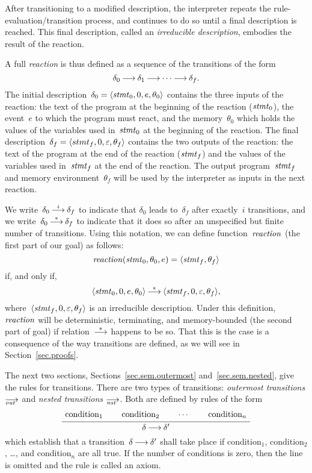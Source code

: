 After transitioning to a modified description, the interpreter repeats the
rule-evaluation/transition process, and continues to do so until a final
description is reached.  This final description, called an \emph{irreducible
  description}, embodies the result of the reaction.

A full \emph{reaction} is thus defined as a sequence of the transitions of
the form
\[
  \delta_0\trans\delta_1\trans\cdots\trans\delta_f.
\]
The initial description~$\delta_0=\<\stmt_0,0,e,\theta_0>$ contains the
three inputs of the reaction: the text of the program at the beginning of
the reaction ($\mathit{stmt}_0$), the event~$e$ to which the program must react, and
the memory~$\theta_0$ which holds the values of the variables used
in~$\mathit{stmt}_0$ at the beginning of the reaction.  The final
description~$\delta_f=\<stmt_f,0,\nil,\theta_f>$ contains the two outputs of
the reaction: the text of the program at the end of the reaction ($\mathit{stmt}_f$)
and the values of the variables used in~$\mathit{stmt}_f$ at the end of the
reaction.  The output program~$\mathit{stmt}_f$ and memory environment~$\theta_f$
will be used by the interpreter as inputs in the next reaction.

We write~$\delta_0\trans[i]\delta_f$ to indicate that $\delta_0$ leads
to~$\delta_f$ after exactly~$i$ transitions, and we
write~$\delta_0\trans[*]\delta_f$ to indicate that it does so after an
unspecified but finite number of transitions.  Using this notation, we can
define function~$\mathop{\mathit{reaction}}$ (the first part of our goal) as follows:
\[
  \reaction(\stmt_0,\theta_0,e)=\<\stmt_f,\theta_f>
\]
if, and only if,
\[
  \<\stmt_0,0,e,\theta_0>\trans[*]\<\stmt_f,0,\nil,\theta_f>,
\]
where~$\<\stmt_f,0,\nil,\theta_f>$ is an irreducible description.  Under
this definition, $\mathop{\mathit{reaction}}$ will be deterministic, terminating, and
memory-bounded (the second part of goal) if relation~$\trans[*]$ happens to
be so.  That this is the case is a consequence of the way transitions are
defined, as we will see in Section~\ref{sec.proofs}.

\strut{}

The next two sections, Sections~\ref{sec.sem.outermost}
and~\ref{sec.sem.nested}, give the rules for transitions.  There are two
types of transitions: \emph{outermost transitions} $\out$ and \emph{nested
  transitions} $\nst$.  Both are defined by rules of the form
\[
  \AxiomC{\strut condition$_1$}
  \AxiomC{\strut condition$_2$}
  \AxiomC{$\cdots$}
  \AxiomC{\strut condition$_n$}
  \QuaternaryInfC{$\delta\trans\delta'$}
  \DisplayProof
\]
which establish that a transition~$\delta\trans\delta'$ shall take place if
condition$_1$, condition$_2$, \dots, and condition$_n$ are all true.  If the
number of conditions is zero, then the line is omitted and the rule is
called an axiom.

